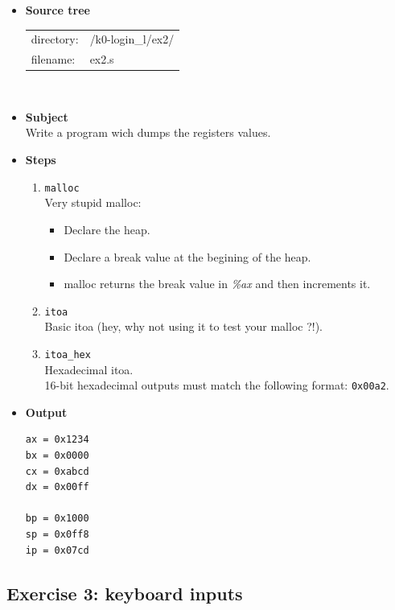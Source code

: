 \begin{itemize}
\item {\bf Source tree}\\
\begin{tabular}{p{4cm}l}
directory: & /k0-login\_l/ex2/\\
filename: & ex2.s
\end{tabular}
\\
\item {\bf Subject}\\
Write a program wich dumps the registers values.\\
\item {\bf Steps}
  \begin{enumerate}
  \item {\tt malloc}\\
  Very stupid malloc:
  \begin{itemize}
  \item Declare the heap.
  \item Declare a break value at the begining of the heap.
  \item malloc returns the break value in {\em \%ax} and then increments it.
  \end{itemize}
  \item {\tt itoa}\\
  Basic itoa (hey, why not using it to test your malloc ?!).
  \item {\tt itoa\_hex}\\
  Hexadecimal itoa.\\
  16-bit hexadecimal outputs must match the following format: {\tt 0x00a2}.
\\
  \end{enumerate}
\item {\bf Output}
\begin{verbatim}
ax = 0x1234
bx = 0x0000
cx = 0xabcd
dx = 0x00ff

bp = 0x1000
sp = 0x0ff8
ip = 0x07cd
\end{verbatim}

\end{itemize}

\newpage

\subsection*{Exercise 3: keyboard inputs}

